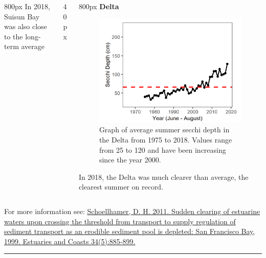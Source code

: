\documentclass[
]{book}
\begin{document}
\begin{columns}[T]
\begin{column}{800px\textwidth}
In 2018, Suisun Bay was also close to the long-term average
\end{column}

\begin{column}{40px\textwidth}
~
\end{column}

\begin{column}{800px\textwidth}
\textbf{Delta}

\begin{figure}
\includegraphics[width=15.25in]{figures/secchi_dtsummer} \caption{Graph of average summer secchi depth in the Delta from 1975 to 2018. Values range from 25 to 120 and have been increasing since the year 2000.}\label{fig:unnamed-chunk-53}
\end{figure}

In 2018, the Delta was much clearer than average, the clearest summer on record.
\end{column}
\end{columns}

\begin{disclaimer}
For more information see:
\href{https://link.springer.com/article/10.1007/s12237-011-9382-x}{Schoellhamer,
D. H. 2011. Sudden clearing of estuarine waters upon crossing the
threshold from transport to supply regulation of sediment transport as
an erodible sediment pool is depleted: San Francisco Bay, 1999.
Estuaries and Coasts 34(5):885-899.}
\end{disclaimer}

\begin{center}\rule{0.5\linewidth}{0.5pt}\end{center}
\end{document}
